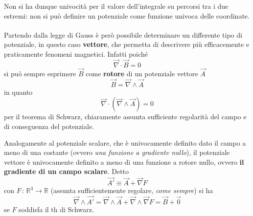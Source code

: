Non si ha dunque univocità per il valore dell'integrale su percorsi tra i due estremi: non si può definire un potenziale come funzione univoca delle coordinate.
\\~\\Partendo dalla legge di Gauss è però possibile determinare un differente tipo di potenziale, in questo caso \textbf{vettore}, che permetta di descrivere più efficacemente e praticamente fenomeni magnetici. Infatti poiché
\[\vec{\nabla} \cdot \vec{B} = 0\]
si può sempre esprimere $\vec{B}$ come \textbf{rotore} di un potenziale vettore $\vec{A}$
\[\vec{B} = \vec{\nabla} \wedge \vec{A}\]
in quanto
\[\vec{\nabla} \cdot (\vec{\nabla} \wedge \vec{A}) = 0\]
per il teorema di Schwarz, chiaramente assunta sufficiente regolarità del campo e di conseguenza del potenziale. 

Analogamente al potenziale scalare, che è univocamente definito dato il campo a meno di una costante (ovvero \textit{una funzione a gradiente nullo}), il potenziale vettore è univocamente definito a meno di una funzione a rotore nullo, ovvero \textbf{il gradiente di un campo scalare}. Detto
\[\vec{A'} \equiv \vec{A} + \vec{\nabla} F\]
con $F \, : \, \mathbb{R}^3 \rightarrow \mathbb{R}$ (assunta sufficientemente regolare, \textit{come sempre}) si ha
\[\vec{\nabla} \wedge \vec{A'} = \vec{\nabla} \wedge \vec{A} + \vec{\nabla} \wedge \vec{\nabla} F = \vec{B} + \vec{0}\]
se $F$ soddisfa il th di Schwarz.


